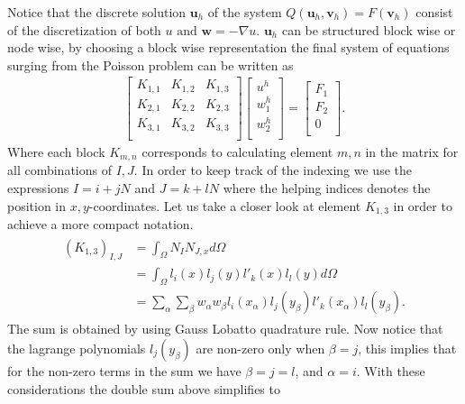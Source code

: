 Notice that the discrete solution $\mathbf{u}_h$ of the system $Q(\mathbf{u}_h,\mathbf{v}_h) = F(\mathbf{v}_h)$ consist of the discretization of both $u \text{ and } \mathbf{w} = - \nabla u$. $\mathbf{u}_h$ can be structured block wise or node wise, by choosing a block wise representation the final system of equations surging from the Poisson problem can be written as 
%
\begin{align}
	\begin{bmatrix}
		K_{1,1} & K_{1,2} &	K_{1,3} \\ 	
		K_{2,1} & K_{2,2} & K_{2,3} \\ 	
		K_{3,1} & K_{3,2} & K_{3,3} \\ 	
	\end{bmatrix}
	\begin{bmatrix}
	 u^h \\ 	
	 w^h_1\\ 	
	 w^h_2\\ 	
	\end{bmatrix}
	=
	\begin{bmatrix}
	 F_1 \\ 	
	 F_2\\ 	
	 0 \\ 	
	\end{bmatrix}.
	\label{eq:KMatrix}
\end{align}
%
Where each block $K_{m,n}$ corresponds to  calculating element $m,n$ in the matrix for all combinations of $I,J$. In order to keep track of the indexing we use the expressions $I = i+jN$ and $J = k+lN$ where the helping indices denotes the position in $x,y$-coordinates. Let us take a closer look at element $K_{1,3}$ in order to achieve a more compact notation. 
\begin{align}
	\begin{split}
	(K_{1,3})_{I,J} &= \int_{\Omega} N_I N_{J,x} d\Omega \\
	&= \int_{\Omega} l_i(x)l_j(y)l'_k(x)l_l(y) d\Omega \\
	&= \sum_{\alpha}\sum_{\beta} w_{\alpha}w_{\beta}l_i(x_{\alpha})l_j(y_{\beta})l'_k(x_{\alpha})l_l(y_{\beta}).
	\end{split}
	\label{eq:MatrixDerivation}
\end{align}
The sum is obtained by using Gauss Lobatto quadrature rule. Now notice that the lagrange polynomials $l_j(y_{\beta})$ are non-zero only when $\beta = j$, this implies that for the non-zero terms in the sum we have $\beta = j=l$, and $\alpha = i$. With these considerations the double sum above simplifies to  
